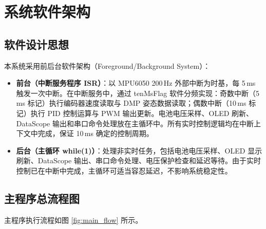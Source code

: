 \documentclass[12pt,a4paper,UTF8]{ctexrep}
\begin{document}
\section{系统软件架构}

\subsection{软件设计思想}

本系统采用前后台软件架构（Foreground/Background System）：

\begin{itemize}
  \item \textbf{前台（中断服务程序 ISR）}：以 MPU6050 200\,Hz 外部中断为时基，每 5\,ms 触发一次中断。在中断服务中，通过 tenMsFlag 软件分频实现：奇数中断（5\,ms 标记）执行编码器速度读取与 DMP 姿态数据读取；偶数中断（10\,ms 标记）执行 PID 控制运算与 PWM 输出更新。电池电压采样、OLED 刷新、DataScope 输出和串口命令处理放在主循环中。所有实时控制逻辑均在中断上下文中完成，保证 10\,ms 确定的控制周期。
  \item \textbf{后台（主循环 while(1)）}：处理非实时任务，包括电池电压采样、OLED 显示刷新、DataScope 输出、串口命令处理、电压保护检查和延迟等待。由于实时控制已在中断中完成，主循环可适当容忍延迟，不影响系统稳定性。
\end{itemize}

\subsection{主程序总流程图}

主程序执行流程如图 \ref{fig:main_flow} 所示。
\end{document}

